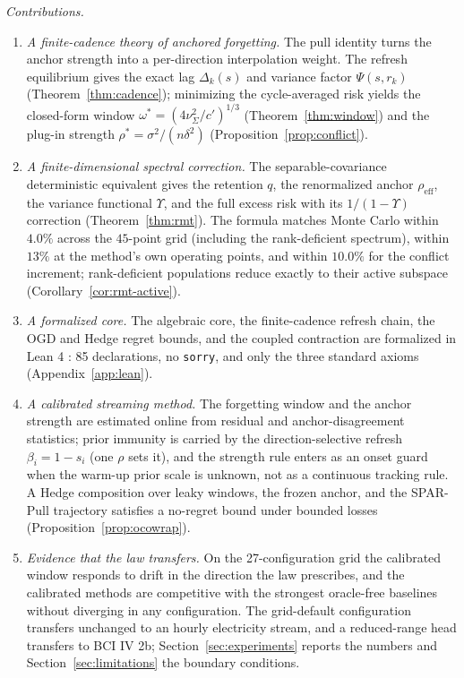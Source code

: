 \documentclass[twoside,11pt]{article}
\begin{document}
\emph{Contributions.}
\begin{enumerate}
\item \emph{A finite-cadence theory of anchored forgetting.}
The pull identity turns the anchor strength into a per-direction interpolation weight.
The refresh equilibrium gives the exact lag $\Delta_k(s)$ and variance factor $\Psi(s,r_k)$ (Theorem~\ref{thm:cadence}); minimizing the cycle-averaged risk yields the closed-form window $\omega^*=(4\nu^2_\Sigma/c')^{1/3}$ (Theorem~\ref{thm:window}) and the plug-in strength $\rho^*=\sigma^2/(n\delta^2)$ (Proposition~\ref{prop:conflict}).

\item \emph{A finite-dimensional spectral correction.}
The separable-covariance deterministic equivalent gives the retention $q$, the renormalized anchor $\rho_{\mathrm{eff}}$, the variance functional $\Upsilon$, and the full excess risk with its $1/(1-\Upsilon)$ correction (Theorem~\ref{thm:rmt}).
The formula matches Monte Carlo within $4.0\%$ across the $45$-point grid (including the rank-deficient spectrum), within $13\%$ at the method's own operating points, and within $10.0\%$ for the conflict increment; rank-deficient populations reduce exactly to their active subspace (Corollary~\ref{cor:rmt-active}).

\item \emph{A formalized core.}
The algebraic core, the finite-cadence refresh chain, the OGD and Hedge regret bounds, and the coupled contraction are formalized in Lean 4 \citep{demoura2021,mathlib2020}: 85 declarations, no \texttt{sorry}, and only the three standard axioms (Appendix~\ref{app:lean}).

\item \emph{A calibrated streaming method.}
The forgetting window and the anchor strength are estimated online from residual and anchor-disagreement statistics; prior immunity is carried by the direction-selective refresh $\beta_i = 1 - s_i$ (one $\rho$ sets it), and the strength rule enters as an onset guard when the warm-up prior scale is unknown, not as a continuous tracking rule.
A Hedge composition over leaky windows, the frozen anchor, and the SPAR-Pull trajectory satisfies a no-regret bound under bounded losses (Proposition~\ref{prop:ocowrap}).

\item \emph{Evidence that the law transfers.}
On the 27-configuration grid the calibrated window responds to drift in the direction the law prescribes, and the calibrated methods are competitive with the strongest oracle-free baselines without diverging in any configuration.
The grid-default configuration transfers unchanged to an hourly electricity stream, and a reduced-range head transfers to BCI IV 2b; Section~\ref{sec:experiments} reports the numbers and Section~\ref{sec:limitations} the boundary conditions.
\end{enumerate}
\end{document}
